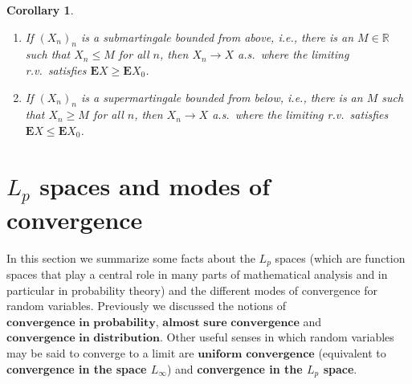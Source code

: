 \documentclass[11pt]{report}
\newcommand{\R}{\mathbb{R}}
\theoremstyle{plain}
\newtheorem{cor}[thm]{Corollary}
\theoremstyle{definition}
\begin{document}
\begin{cor}
\label{mart-conv-cor}

\begin{enumerate}[label=\arabic*.]
\item If $(X_n)_n$ is a submartingale bounded from above, i.e., there is an $M\in\R$ such that $X_n\le M$ for all $n$, then $X_n\to X$ a.s.\ where the limiting r.v.\ satisfies $\mathbf{E} X \ge \mathbf{E} X_0$.
\item If $(X_n)_n$ is a supermartingale bounded from below, i.e., there is an $M$ such that $X_n\ge M$ for all $n$, then $X_n\to X$ a.s.\ where the limiting r.v.\ satisfies $\mathbf{E} X \le \mathbf{E} X_0$.
\end{enumerate}

\end{cor}

\section{$L_p$ spaces and modes of convergence}
In this section we summarize some facts about the $L_p$ spaces (which are function spaces that play a central role in many parts of mathematical analysis and in particular in probability theory) and the different modes of convergence for random variables. Previously we discussed the notions of $\textbf{convergence in probability}$, $\textbf{almost sure convergence}$ and $\textbf{convergence in distribution}$. Other useful senses in which random variables may be said to converge to a limit are $\textbf{uniform convergence}$ (equivalent to \textbf{convergence in the space $L_\infty$}) and \textbf{convergence in the $L_p$ space}.
\end{document}
